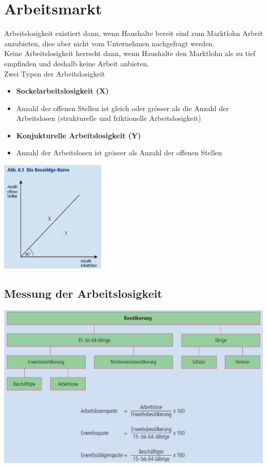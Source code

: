 \section{Arbeitsmarkt}
Arbeitslosigkeit existiert dann, wenn Haushalte bereit sind zum Marktlohn Arbeit anzubieten, diee aber nicht vom Unternehmen nachgefragt werden.\\
Keine Arbeitslosigkeit herrscht dann, wenn Haushalte den Marktlohn als zu tief empfinden und deshalb keine Arbeit anbieten.\\
Zwei Typen der Arbeitslosigkeit\\
\begin{minipage}{10cm}
	\begin{itemize}
		\item \textbf{Sockelarbeitslosigkeit (X)}
		\item Anzahl der offenen Stellen ist gleich oder grösser als die Anzahl der Arbeitslosen (strukturelle und friktionelle Arbeitslosigkeit)
		\item \textbf{Konjukturelle Arbeitslosigkeit (Y)}
		\item Anzahl der Arbeitslosen ist grösser als Anzahl der offenen Stellen
	\end{itemize}
\end{minipage}
\begin{minipage}{5cm}
	\includegraphics[width=5cm]{images/beveridge.jpg}
\end{minipage}
\subsection{Messung der Arbeitslosigkeit}
\includegraphics[width=0.8\linewidth]{images/messung.jpg}
